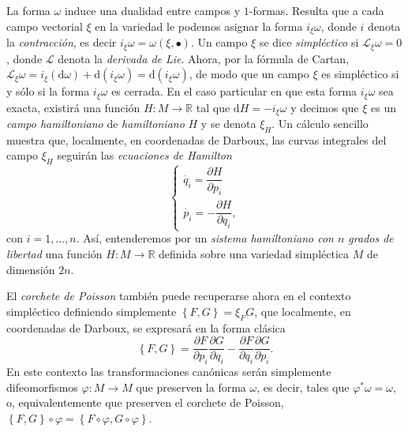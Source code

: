 \documentclass[11pt,a4paper,twoside]{article}
\theoremstyle{definition} \newtheorem{defn}[thm]{Definición}
\theoremstyle{definition} \newtheorem{ejemplo}[thm]{Ejemplo}
\theoremstyle{definition} \newtheorem{ejercicio}[thm]{Ejercicio}
\theoremstyle{remark} \newtheorem*{obs}{Observación}
\def\RR{\mathbb{R}}
\def\dd{\mathrm{d}}
\def\lie{\mathscr{L}}
\newcommand{\parcial}[2]{\frac{\partial #1}{\partial #2}}
\begin{document}
La forma $\omega$ induce una dualidad entre campos y $1$-formas. Resulta que a cada campo vectorial $\xi$ en la variedad le podemos asignar la forma $i_{\xi}\omega$, donde $i$ denota la \emph{contracción}, es decir $i_{\xi}\omega=\omega(\xi,\bullet)$. Un campo $\xi$ se dice \emph{simpléctico} si $\lie_{\xi}\omega=0$, donde $\lie$ denota la \emph{derivada de Lie}. Ahora, por la fórmula de Cartan, $\lie_{\xi}\omega=i_{\xi}(\dd \omega)+\dd(i_{\xi}\omega)=\dd(i_{\xi}\omega)$, de modo que un campo $\xi$ es simpléctico si y sólo si la forma $i_{\xi}\omega$ es cerrada. En el caso particular en que esta forma $i_{\xi}\omega$ sea exacta, existirá una función $H:M\rightarrow \RR$ tal que $\dd H=-i_{\xi}\omega$ y decimos que $\xi$ es un \emph{campo hamiltoniano} de \emph{hamiltoniano} $H$ y se denota $\xi_H$. Un cálculo sencillo muestra que, localmente, en coordenadas de Darboux, las curvas integrales del campo $\xi_H$ seguirán las \emph{ecuaciones de Hamilton}
\begin{equation}
  \begin{cases}
    \dot{q_i}=\dfrac{\partial H}{\partial p_i}\\[6 pt] 
    \dot{p_i}=-\dfrac{\partial H}{\partial q_i} ,
  \end{cases}
  \label{eq:hamilton}
\end{equation}
con $i=1,\dots,n$.
Así, entenderemos por un \emph{sistema hamiltoniano con $n$ grados de libertad} una función $H:M\rightarrow \RR$ definida sobre una variedad simpléctica $M$ de dimensión $2n$.

El  \emph{corchete de Poisson} también puede recuperarse ahora en el contexto simpléctico definiendo simplemente $\left\{ F,G \right\}=\xi_F G$, que localmente, en coordenadas de Darboux, se expresará en la forma clásica
\begin{equation}
  \left\{ F,G \right\}=\parcial{F}{p_i}\parcial{G}{q_i}-\parcial{F}{q_i}\parcial{G}{p_i}.
  \label{eq:poisson}
\end{equation}
En este contexto las transformaciones canónicas serán simplemente difeomorfismos $\varphi:M\rightarrow M$ que preserven la forma $\omega$, es decir, tales que $\varphi^*\omega=\omega$, o, equivalentemente que preserven el corchete de Poisson, $\left\{ F,G \right\}\circ \varphi=\left\{ F\circ \varphi,G\circ \varphi \right\}$.
\end{document}
